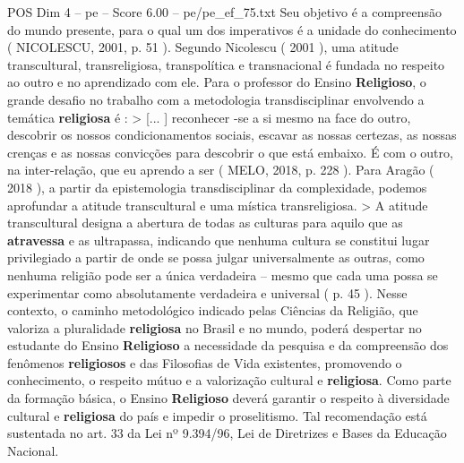 \begin{textsample}{POS Dim 4 – pe – Score 6.00 – pe/pe\_ef\_75.txt}
Seu objetivo é a compreensão do mundo presente, para o qual um dos imperativos é a unidade do conhecimento ( NICOLESCU, 2001, p. 51 ).
Segundo Nicolescu ( 2001 ), uma atitude transcultural, transreligiosa, transpolítica e transnacional é fundada no respeito ao outro e no aprendizado com ele.
Para o professor do Ensino \textbf{Religioso}, o grande desafio no trabalho com a metodologia transdisciplinar envolvendo a temática \textbf{religiosa} é : > [... ] reconhecer -se a si mesmo na face do outro, descobrir os nossos condicionamentos sociais, escavar as nossas certezas, as nossas crenças e as nossas convicções para descobrir o que está embaixo.
É com o outro, na inter-relação, que eu aprendo a ser ( MELO, 2018, p. 228 ).
Para Aragão ( 2018 ), a partir da epistemologia transdisciplinar da complexidade, podemos aprofundar a atitude transcultural e uma mística transreligiosa. > A atitude transcultural designa a abertura de todas as culturas para aquilo que as \textbf{atravessa} e as ultrapassa, indicando que nenhuma cultura se constitui lugar privilegiado a partir de onde se possa julgar universalmente as outras, como nenhuma religião pode ser a única verdadeira – mesmo que cada uma possa se experimentar como absolutamente verdadeira e universal ( p. 45 ).
Nesse contexto, o caminho metodológico indicado pelas Ciências da Religião, que valoriza a pluralidade \textbf{religiosa} no Brasil e no mundo, poderá despertar no estudante do Ensino \textbf{Religioso} a necessidade da pesquisa e da compreensão dos fenômenos \textbf{religiosos} e das Filosofias de Vida existentes, promovendo o conhecimento, o respeito mútuo e a valorização cultural e \textbf{religiosa}.
Como parte da formação básica, o Ensino \textbf{Religioso} deverá garantir o respeito à diversidade cultural e \textbf{religiosa} do país e impedir o proselitismo.
Tal recomendação está sustentada no art. 33 da Lei nº 9.394/96, Lei de Diretrizes e Bases da Educação Nacional.

\end{textsample}
